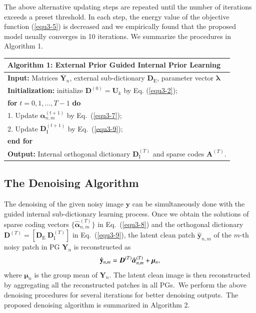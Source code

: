 The above alternative updating steps are repeated until the number of iterations exceeds a preset threshold. In each step, the energy value of the objective function (\ref{equ3-5}) is decreased and we empirically found that the proposed model usually converges in 10 iterations. We summarize the procedures in Algorithm 1.


\begin{table}[t!]
\label{alg3-1}
\begin{tabular}{l}
\hline
\textbf{Algorithm 1}: External Prior Guided Internal Prior Learning
\\
\hline
\textbf{Input:} Matrices $\bm{\overline{Y}}_{n}$, external sub-dictionary $\bm{D}_{\text{E}}$, parameter vector $\bm{\lambda}$
\\
\textbf{Initialization:} initialize $\bm{D}^{(0)}=\bm{U}_{k}$ by Eq. (\ref{equ3-2});
\\
\textbf{for} $t=0,1, ...,T-1$ \textbf{do}
\\
1. Update $\bm{\alpha}_{n,m}^{(t+1)}$ by Eq.\ (\ref{equ3-7});
\\
2. Update $\bm{D}_{\text{I}}^{(t+1)}$ by Eq.\ (\ref{equ3-9});
\\
\textbf{end for}
\\
\textbf{Output:} Internal orthogonal dictionary $\bm{D}_{\text{I}}^{(T)}$ and sparse codes $\textbf{A}^{(T)}$.
\\
\hline
\end{tabular}
\end{table}



\subsection{The Denoising Algorithm}

The denoising of the given noisy image $\mathbf{y}$ can be simultaneously done with the guided internal sub-dictionary learning process. Once we obtain the solutions of sparse coding vectors $\{\hat{\bm{\alpha}}_{n,m}^{(T)}\}$ in Eq.\ (\ref{equ3-8}) and the orthogonal dictionary $\bm{D}^{(T)} = [\bm{D}_{\text{E}}\ \bm{D}_{\text{I}}^{(T)}]$ in Eq.\ (\ref{equ3-9}), the latent clean patch $\hat{\mathbf{y}}_{n,m}$ of the $m$-th noisy patch in PG $\bm{Y}_{n}$ is reconstructed as
\vspace{-2mm}
\begin{equation}\label{equ3-13}
\vspace{-2mm}
\hat{\mathbf{y}}_{n,m}=\bm{D}^{(T)}\hat{\bm{\alpha}}_{n,m}^{(T)}+\bm{\mu}_{n},
\end{equation}
where $\bm{\mu}_{n}$ is the group mean of $\bm{Y}_{n}$. The latent clean image is then reconstructed by aggregating all the reconstructed patches in all PGs.\ We perform the above denoising procedures for several iterations for better denoising outputs.\ The proposed denoising algorithm is summarized in Algorithm 2.

